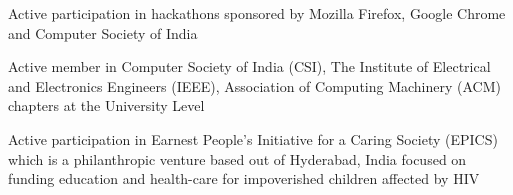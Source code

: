 \begin{cventries}
  \cventry
    {}{}{}{}
    {
      \begin{cvitems}
        \item {Active participation in hackathons sponsored by Mozilla Firefox, Google Chrome and Computer Society of India}
        \item {Active member in Computer Society of India (CSI), The Institute of Electrical and Electronics Engineers (IEEE), Association of Computing Machinery (ACM) chapters at the University Level}
        \item{Active participation in Earnest People’s Initiative for a Caring Society	(EPICS) which is a philanthropic venture based out of Hyderabad, India focused on funding education and health-care for impoverished children affected by HIV}
      \end{cvitems}
    }
\end{cventries}
